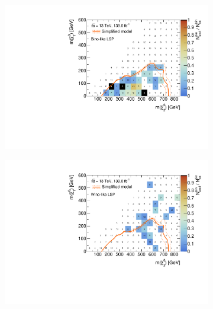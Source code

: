 \begin{figure}
	\begin{subfigure}[b]{0.5\linewidth}
		\centering\includegraphics[width=\textwidth]{cut_bino_LSP/mchi20_mlsp_contour}
	\end{subfigure}\hfill
	\begin{subfigure}[b]{0.5\linewidth}
		\centering\includegraphics[width=\textwidth]{cut_wino_LSP/mchi20_mlsp_contour}
	\end{subfigure}\hfill
	

\end{figure}
